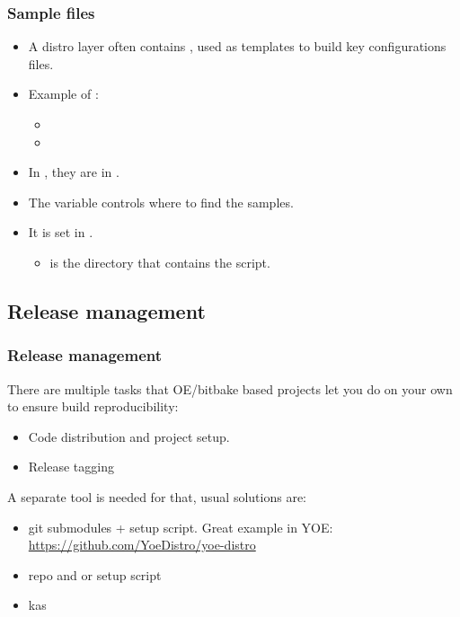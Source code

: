 \begin{frame}
  \frametitle{Sample files}
  \begin{itemize}
    \item A distro layer often contains , used as
      templates to build key configurations files.
    \item Example of :
      \begin{itemize}
        \item {}
        \item {}
      \end{itemize}
    \item In , they are in .
    \item The  variable controls where to find the
      samples.
    \item It is set in .
      \begin{itemize}
        \item {} is the directory that contains the
           script.
      \end{itemize}
  \end{itemize}
\end{frame}

\subsection{Release management}

\begin{frame}[fragile]
  \frametitle{Release management}
  There are multiple tasks that OE/bitbake based projects let you do
  on your own to ensure build reproducibility:
  \begin{itemize}
  \item Code distribution and project setup.
  \item Release tagging
  \end{itemize}
  A separate tool is needed for that, usual solutions are:
  \begin{itemize}
  \item git submodules + setup script. Great example in YOE:
    \url{https://github.com/YoeDistro/yoe-distro}
  \item repo and  or setup script
  \item kas
  \end{itemize}
\end{frame}

